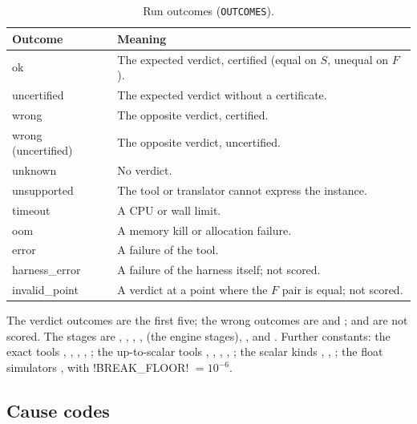 \begin{xltabular}{\textwidth}{@{}>{\ttfamily}p{0.22\textwidth} X@{}}
\caption{Run outcomes (\texttt{OUTCOMES}).}\label{tab:bench-outcome-list}\\
\toprule
\normalfont Outcome & Meaning\\
\midrule\endfirsthead
\bottomrule\endfoot
ok & The expected verdict, certified (equal on $S$, unequal on $F$).\\
uncertified & The expected verdict without a certificate.\\
wrong & The opposite verdict, certified.\\
wrong (uncertified) & The opposite verdict, uncertified.\\
unknown & No verdict.\\
unsupported & The tool or translator cannot express the instance.\\
timeout & A CPU or wall limit.\\
oom & A memory kill or allocation failure.\\
error & A failure of the tool.\\
harness\_error & A failure of the harness itself; not scored.\\
invalid\_point & A verdict at a point where the $F$ pair is equal; not scored.\\
\end{xltabular}

The verdict outcomes are the first five; the wrong outcomes are  and ;  and  are not scored. The stages are
, , , ,  (the
engine stages), , and . Further constants: the exact tools
, , , , ; the up-to-scalar tools
, , , , ; the scalar kinds
, , ; the float simulators
,  with \py!BREAK_FLOOR! $=10^{-6}$.

\subsection{Cause codes}

